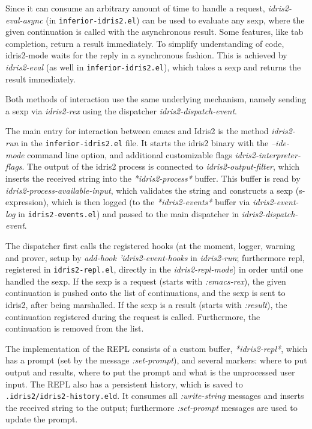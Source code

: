 \documentclass{article}
\begin{document}
Since it can consume an arbitrary amount of time to handle a request, \emph{idris2-eval-async} (in \texttt{inferior-idris2.el}) can be used to evaluate any sexp, where the given continuation is called with the asynchronous result.
Some features, like tab completion, return a result immediately.
To simplify understanding of code, idris2-mode waits for the reply in a synchronous fashion.
This is achieved by \emph{idris2-eval} (as well in \texttt{inferior-idris2.el}), which takes a sexp and returns the result immediately.

Both methods of interaction use the same underlying mechanism, namely sending a sexp via \emph{idris2-rex} using the dispatcher \emph{idris2-dispatch-event}.

The main entry for interaction between emacs and Idris2 is the method \emph{idris2-run} in the \texttt{inferior-idris2.el} file.
It starts the idris2 binary with the \emph{--ide-mode} command line option, and additional customizable flags \emph{idris2-interpreter-flags}.
The output of the idris2 process is connected to \emph{idris2-output-filter}, which inserts the received string into the \emph{*idris2-process*} buffer.
This buffer is read by \emph{idris2-process-available-input}, which validates the string and constructs a sexp (s-expression), which is then logged (to the \emph{*idris2-events*} buffer via \emph{idris2-event-log} in \texttt{idris2-events.el}) and passed to the main dispatcher in \emph{idris2-dispatch-event}.

The dispatcher first calls the registered hooks (at the moment, logger, warning and prover, setup by \emph{add-hook 'idris2-event-hooks} in \emph{idris2-run}; furthermore repl, registered in \texttt{idris2-repl.el}, directly in the \emph{idris2-repl-mode}) in order until one handled the sexp.
If the sexp is a request (starts with \emph{:emacs-rex}), the given continuation is pushed onto the list of continuations, and the sexp is sent to idris2, after being marshalled.
If the sexp is a result (starts with \emph{:result}), the continuation registered during the request is called.
Furthermore, the continuation is removed from the list.

The implementation of the REPL consists of a custom buffer, \emph{*idris2-repl*}, which has a prompt (set by the message \emph{:set-prompt}), and several markers: where to put output and results, where to put the prompt and what is the unprocessed user input.
The REPL also has a persistent history, which is saved to \texttt{.idris2/idris2-history.eld}.
It consumes all \emph{:write-string} messages and inserts the received string to the output; furthermore \emph{:set-prompt} messages are used to update the prompt.
\end{document}
